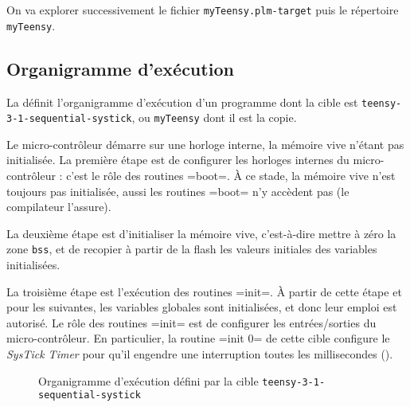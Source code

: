On va explorer successivement le fichier \texttt{myTeensy.plm-target} puis le répertoire \texttt{myTeensy}.

\subsection{Organigramme d'exécution}

La  définit l'organigramme d'exécution d'un programme dont la cible est \texttt{teensy-3-1-sequential-systick}, ou \texttt{myTeensy} dont il est la copie.

Le micro-contrôleur démarre sur une horloge interne, la mémoire vive n'étant pas initialisée. La première étape est de configurer les horloges internes du micro-contrôleur : c'est le rôle des routines \plm=boot=. À ce stade, la mémoire vive n'est toujours pas initialisée, aussi les routines \plm=boot= n'y accèdent pas (le compilateur l'assure).

La deuxième étape est d'initialiser la mémoire vive, c'est-à-dire mettre à zéro la zone \texttt{bss}, et de recopier à partir de la flash les valeurs initiales des variables initialisées.

La troisième étape est l'exécution des routines \plm=init=. À partir de cette étape et pour les suivantes, les variables globales sont initialisées, et donc leur emploi est autorisé. Le rôle des routines \plm=init= est de configurer les entrées/sorties du micro-contrôleur. En particulier, la routine \plm=init 0= de cette cible configure le \emph{SysTick Timer} pour qu'il engendre une interruption toutes les millisecondes ().


\begin{figure}[t]
  \centering
  \small
  \caption{Organigramme d'exécution défini par la cible \texttt{teensy-3-1-sequential-systick}}
  \ligne
\end{figure}








